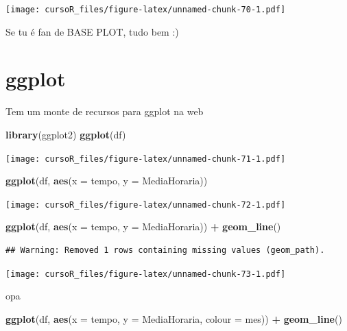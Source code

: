 \documentclass[]{book}
\newenvironment{Shaded}{\begin{snugshade}}{\end{snugshade}}
\newcommand{\KeywordTok}[1]{\textcolor[rgb]{0.13,0.29,0.53}{\textbf{#1}}}
\newcommand{\DataTypeTok}[1]{\textcolor[rgb]{0.13,0.29,0.53}{#1}}
\newcommand{\StringTok}[1]{\textcolor[rgb]{0.31,0.60,0.02}{#1}}
\newcommand{\OperatorTok}[1]{\textcolor[rgb]{0.81,0.36,0.00}{\textbf{#1}}}
\newcommand{\NormalTok}[1]{#1}
\begin{document}
\texttt{[image: cursoR\_files/figure-latex/unnamed-chunk-70-1.pdf]}

Se tu é fan de BASE PLOT, tudo bem :)

\section{ggplot}\label{ggplot}

Tem um monte de recursos para ggplot na web

\begin{Shaded}
\begin{Highlighting}[]
\KeywordTok{library}\NormalTok{(ggplot2)}
\KeywordTok{ggplot}\NormalTok{(df)}
\end{Highlighting}
\end{Shaded}

\texttt{[image: cursoR\_files/figure-latex/unnamed-chunk-71-1.pdf]}

\begin{Shaded}
\begin{Highlighting}[]
\KeywordTok{ggplot}\NormalTok{(df, }\KeywordTok{aes}\NormalTok{(}\DataTypeTok{x =}\NormalTok{ tempo, }\DataTypeTok{y =}\NormalTok{ MediaHoraria))}
\end{Highlighting}
\end{Shaded}

\texttt{[image: cursoR\_files/figure-latex/unnamed-chunk-72-1.pdf]}

\begin{Shaded}
\begin{Highlighting}[]
\KeywordTok{ggplot}\NormalTok{(df, }\KeywordTok{aes}\NormalTok{(}\DataTypeTok{x =}\NormalTok{ tempo, }\DataTypeTok{y =}\NormalTok{ MediaHoraria)) }\OperatorTok{+}\StringTok{ }
\StringTok{  }\KeywordTok{geom_line}\NormalTok{()}
\end{Highlighting}
\end{Shaded}

\begin{verbatim}
## Warning: Removed 1 rows containing missing values (geom_path).
\end{verbatim}

\texttt{[image: cursoR\_files/figure-latex/unnamed-chunk-73-1.pdf]}

opa

\begin{Shaded}
\begin{Highlighting}[]
\KeywordTok{ggplot}\NormalTok{(df, }\KeywordTok{aes}\NormalTok{(}\DataTypeTok{x =}\NormalTok{ tempo, }\DataTypeTok{y =}\NormalTok{ MediaHoraria, }\DataTypeTok{colour =}\NormalTok{ mes)) }\OperatorTok{+}\StringTok{ }
\StringTok{  }\KeywordTok{geom_line}\NormalTok{() }
\end{Highlighting}
\end{Shaded}
\end{document}
